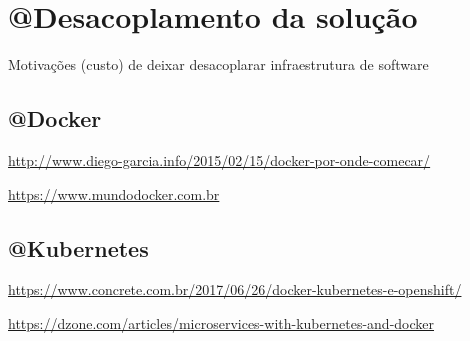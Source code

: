 \chapter{@Desacoplamento da solução}

Motivações (custo) de deixar desacoplarar infraestrutura de software

\section{@Docker}

\url{http://www.diego-garcia.info/2015/02/15/docker-por-onde-comecar/}

\url{https://www.mundodocker.com.br}

\section{@Kubernetes}

\url{https://www.concrete.com.br/2017/06/26/docker-kubernetes-e-openshift/}

\url{https://dzone.com/articles/microservices-with-kubernetes-and-docker}
